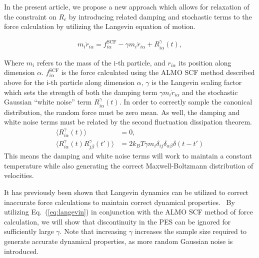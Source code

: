 \documentclass[aps,prl,reprint,amsmath,amssymb]{revtex4-1}
\begin{document}
In the present article, we propose a new approach which allows for relaxation of the constraint on $R_{c}$ by introducing related damping and stochastic terms to the force calculation by utilizing the Langevin equation of motion.~\cite{a:Kubo-1986}

\begin{align}
\label{eq:langevin}
m_i \ddot{r}_{i\alpha} = f^{\text{SCF}}_{i\alpha} - \gamma m_i \dot{r}_{i\alpha} + R^{\gamma}_{i\alpha} (t),
\end{align}

Where $m_i$ refers to the mass of the i-th particle, and $r_{i\alpha}$ its position along dimension $\alpha$. 
$f^{\text{SCF}}_{i\alpha}$ is the force calculated using the ALMO SCF method described above for the i-th particle along dimension $\alpha$, $\gamma$ is the Langevin scaling factor which sets the strength of both the damping term  $\gamma m_i \dot{r}_{i\alpha}$ and the stochastic Gaussian ``white noise'' term $R^{\gamma}_{i\alpha} (t)$. 
In order to correctly sample the canonical distribution, the random force must be zero mean. 
As well, the damping and white noise terms must be related by the second fluctuation dissipation theorem.~\cite{a:Kubo-1986,a:langevin-why,b:tuckerman-stat}
%
\begin{align}
\label{eq:stochastic}
\langle R^{\gamma}_{i\alpha} (t) \rangle &= 0, \\
\langle R^{\gamma}_{i\alpha} (t)  R^{\gamma}_{j\beta} (t') \rangle &= 2 k_B T \gamma m_i \delta_{ij} \delta_{\alpha\beta} \delta(t-t')
\end{align}
%
This means the damping and white noise terms will work to maintain a constant temperature while also generating the correct Maxwell-Boltzmann distribution of velocities. 

It has previously been shown that Langevin dynamics can be utilized to correct inaccurate force calculations to maintain correct dynamical properties.~\cite{a:langevin-why,a:2ndcpmd,b:tuckerman-stat,a:ceriotti} 
By utilizing Eq.\ (\ref{eq:langevin}) in conjunction with the ALMO SCF method of force calculation, we will show that discontinuity in the PES can be ignored for sufficiently large $\gamma$. 
Note that increasing $\gamma$ increases the sample size required to generate accurate dynamical properties, as more random Gaussian noise is introduced.
\end{document}
